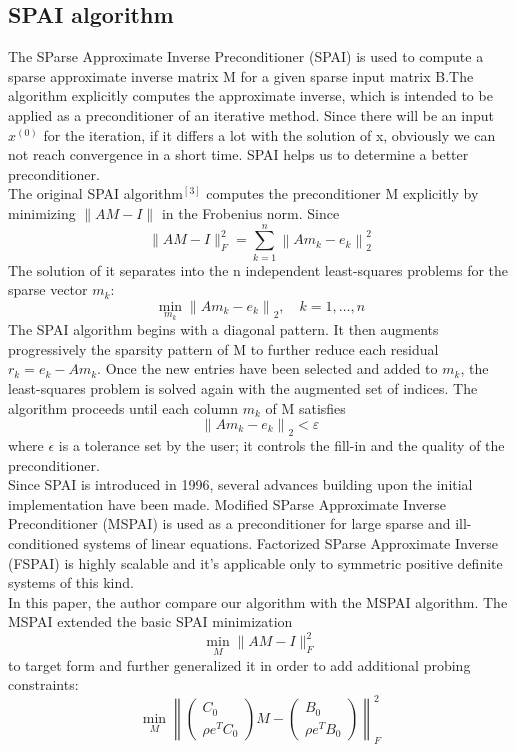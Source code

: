 \documentclass[10pt,journal]{IEEEtran}
\begin{document}
\subsection{SPAI algorithm}
The SParse Approximate Inverse Preconditioner (SPAI) is used to compute a sparse approximate inverse matrix M for a given sparse input matrix B.The algorithm explicitly computes the approximate inverse, which is intended to be applied as a preconditioner of an iterative method. Since there will be an input $x^{(0)}$ for the iteration, if it differs a lot with the solution of x, obviously we can not reach convergence in a short time. SPAI helps us to determine a better preconditioner.\\
The original SPAI algorithm$^{[3]}$ computes the preconditioner M explicitly by minimizing $\| A M - I \|$ in the Frobenius norm. Since
\[\| A M - I \| _ { F } ^ { 2 } = \sum _ { k = 1 } ^ { n } \left\| A m _ { k } - e _ { k } \right\| _ { 2 } ^ { 2 }\]
The solution of it separates into the n independent least-squares problems for the sparse vector $m_k$:
\[\min _ { m _ { k } } \left\| A m _ { k } - e _ { k } \right\| _ { 2 } , \quad k = 1 , \ldots , n\]
The SPAI algorithm begins with a diagonal pattern. It then augments progressively the sparsity pattern of M to further reduce each residual $r _ { k } = e _ { k } - A m _ { k }$. Once the new entries have been selected and added to $m_k$, the least-squares problem is solved again with the augmented set of indices. The algorithm proceeds until each column
$m_k$ of M satisfies
\[\left\| A m _ { k } - e _ { k } \right\| _ { 2 } < \varepsilon\]
where $\epsilon$ is a tolerance set by the user; it controls the fill-in and the quality of the preconditioner.\\
Since SPAI is introduced in 1996, several advances building upon the initial implementation have been made. Modified SParse Approximate Inverse Preconditioner (MSPAI) is used as a preconditioner for large sparse and ill-conditioned systems of linear equations. Factorized SParse Approximate Inverse (FSPAI) is highly scalable and it's applicable only to symmetric positive definite systems of this kind.\\
In this paper, the author compare our algorithm with the MSPAI algorithm. The MSPAI extended the basic SPAI minimization
\[\min _ { M } \| A M - I \| _ { F } ^ { 2 }\]
to target form and further generalized it in order to add additional probing constraints:
\[\min _ { M } \left\| \left( \begin{array} { c } { C _ { 0 } } \\ { \rho e ^ { T } C _ { 0 } } \end{array} \right) M - \left( \begin{array} { c } { B _ { 0 } } \\ { \rho e ^ { T } B _ { 0 } } \end{array} \right) \right\| _ { F } ^ { 2 }\]
\end{document}
